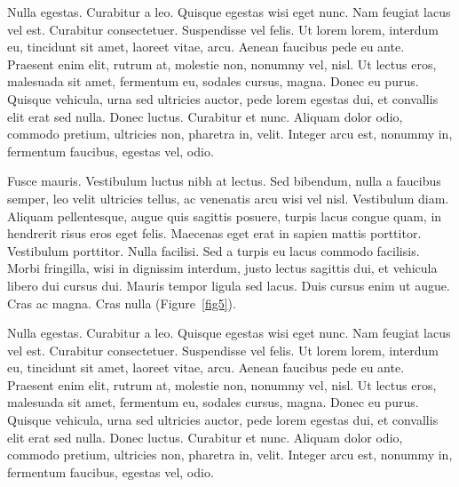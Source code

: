\documentclass[AMA,Times1COL]{WileyNJDv5} %
\begin{document}
Nulla egestas. Curabitur a leo. Quisque egestas wisi eget nunc. Nam feugiat lacus vel est. Curabitur consectetuer.
Suspendisse vel felis. Ut lorem lorem, interdum eu, tincidunt sit amet, laoreet vitae, arcu. Aenean faucibus pede eu
ante. Praesent enim elit, rutrum at, molestie non, nonummy vel, nisl. Ut lectus eros, malesuada sit amet, fermentum
eu, sodales cursus, magna. Donec eu purus. Quisque vehicula, urna sed ultricies auctor, pede lorem egestas dui, et
convallis elit erat sed nulla. Donec luctus. Curabitur et nunc. Aliquam dolor odio, commodo pretium, ultricies non,
pharetra in, velit. Integer arcu est, nonummy in, fermentum faucibus, egestas vel, odio.

%
\vspace*{12pt}
Fusce mauris. Vestibulum luctus nibh at lectus. Sed bibendum, nulla a faucibus semper, leo velit ultricies tellus, ac
venenatis arcu wisi vel nisl. Vestibulum diam. Aliquam pellentesque, augue quis sagittis posuere, turpis lacus congue
quam, in hendrerit risus eros eget felis. Maecenas eget erat in sapien mattis porttitor. Vestibulum porttitor. Nulla
facilisi. Sed a turpis eu lacus commodo facilisis. Morbi fringilla, wisi in dignissim interdum, justo lectus sagittis dui, et
vehicula libero dui cursus dui. Mauris tempor ligula sed lacus. Duis cursus enim ut augue. Cras ac magna. Cras nulla (Figure~\ref{fig5}).

Nulla egestas. Curabitur a leo. Quisque egestas wisi eget nunc. Nam feugiat lacus vel est. Curabitur consectetuer.
Suspendisse vel felis. Ut lorem lorem, interdum eu, tincidunt sit amet, laoreet vitae, arcu. Aenean faucibus pede eu
ante. Praesent enim elit, rutrum at, molestie non, nonummy vel, nisl. Ut lectus eros, malesuada sit amet, fermentum
eu, sodales cursus, magna. Donec eu purus. Quisque vehicula, urna sed ultricies auctor, pede lorem egestas dui, et
convallis elit erat sed nulla. Donec luctus. Curabitur et nunc. Aliquam dolor odio, commodo pretium, ultricies non,
pharetra in, velit. Integer arcu est, nonummy in, fermentum faucibus, egestas vel, odio.
\end{document}
